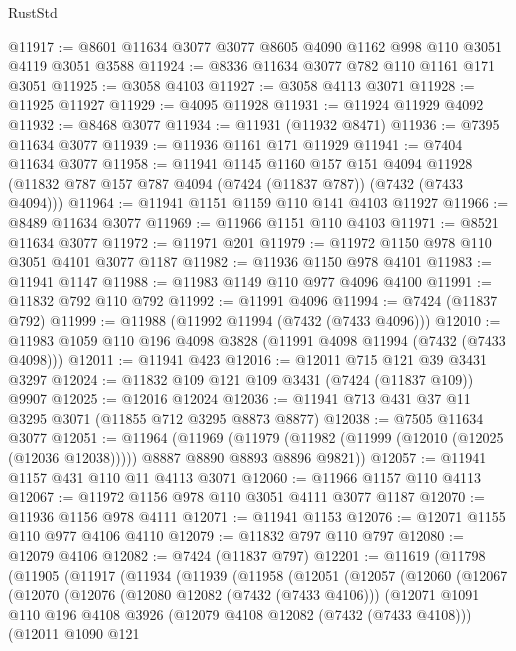 \begin{lexlean}{RustStd}
\begin{coremodule}
{\begin{coremodule}
{{{{{{{{{{{{{{{{{{{{{{{{{{{{{{{{@11917 := @8601 @11634 @3077 @3077 @8605 @4090 @1162 @998 @110 @3051 @4119 @3051 @3588
@11924 := @8336 @11634 @3077 @782 @110 @1161 @171 @3051
@11925 := @3058 @4103
@11927 := @3058 @4113 @3071
@11928 := @11925 @11927
@11929 := @4095 @11928
@11931 := @11924 @11929 @4092
@11932 := @8468 @3077
@11934 := @11931 (@11932 @8471)
@11936 := @7395 @11634 @3077
@11939 := @11936 @1161 @171 @11929
@11941 := @7404 @11634 @3077
@11958 := @11941
    @1145
    @1160
    @157
    @151
    @4094
    @11928
    (@11832 @787 @157 @787 @4094 (@7424 (@11837 @787)) (@7432 (@7433 @4094)))
@11964 := @11941 @1151 @1159 @110 @141 @4103 @11927
@11966 := @8489 @11634 @3077
@11969 := @11966 @1151 @110 @4103
@11971 := @8521 @11634 @3077
@11972 := @11971 @201
@11979 := @11972 @1150 @978 @110 @3051 @4101 @3077 @1187
@11982 := @11936 @1150 @978 @4101
@11983 := @11941 @1147
@11988 := @11983 @1149 @110 @977 @4096 @4100
@11991 := @11832 @792 @110 @792
@11992 := @11991 @4096
@11994 := @7424 (@11837 @792)
@11999 := @11988 (@11992 @11994 (@7432 (@7433 @4096)))
@12010 := @11983 @1059 @110 @196 @4098 @3828 (@11991 @4098 @11994 (@7432 (@7433 @4098)))
@12011 := @11941 @423
@12016 := @12011 @715 @121 @39 @3431 @3297
@12024 := @11832 @109 @121 @109 @3431 (@7424 (@11837 @109)) @9907
@12025 := @12016 @12024
@12036 := @11941 @713 @431 @37 @11 @3295 @3071 (@11855 @712 @3295 @8873 @8877)
@12038 := @7505 @11634 @3077
@12051 := @11964
    (@11969
      (@11979 (@11982 (@11999 (@12010 (@12025 (@12036 @12038))))) @8887 @8890 @8893 @8896 @9821))
@12057 := @11941 @1157 @431 @110 @11 @4113 @3071
@12060 := @11966 @1157 @110 @4113
@12067 := @11972 @1156 @978 @110 @3051 @4111 @3077 @1187
@12070 := @11936 @1156 @978 @4111
@12071 := @11941 @1153
@12076 := @12071 @1155 @110 @977 @4106 @4110
@12079 := @11832 @797 @110 @797
@12080 := @12079 @4106
@12082 := @7424 (@11837 @797)
@12201 := @11619
    (@11798
      (@11905
        (@11917
          (@11934
            (@11939
              (@11958
                (@12051
                  (@12057
                    (@12060
                      (@12067
                        (@12070
                          (@12076
                            (@12080 @12082 (@7432 (@7433 @4106)))
                            (@12071
                              @1091
                              @110
                              @196
                              @4108
                              @3926
                              (@12079 @4108 @12082 (@7432 (@7433 @4108)))
                              (@12011
                                @1090
                                @121
}}}}}}}}}}}}}}}}}}}}}}}}}}}}}}}}
\end{coremodule}}
\end{coremodule}
\end{lexlean}

